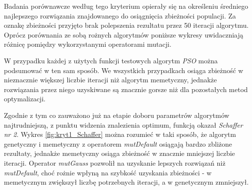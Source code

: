 \par
Badania porównawcze według tego kryterium opierały się na określeniu średniego najlepszego rozwiązania znajdowanego do osiągnięcia zbieżności populacji. Za oznakę zbieżności przyjęto brak polepszenia rezultatu przez 50 iteracji algorytmu. Oprócz porównania ze sobą rożnych algorytmów poniższe wykresy uwidaczniają różnicę pomiędzy wykorzystanymi operatorami mutacji. 
\par
W przypadku każdej z użytych funkcji testowych algorytm \emph{PSO} można podsumować w ten sam sposób. We wszystkich przypadkach osiąga zbieżność w nieznacznie większej liczbie iteracji niż algorytm memetyczny, jednakże rozwiązania przez niego uzyskiwane są znacznie gorsze niż dla pozostałych metod optymalizacji. 
\par 
Zgodnie z tym co zauważono już na etapie doboru parametrów algorytmów  najtrudniejszą, z punktu widzenia znalezienia optimum, funkcją okazał \emph{Schaffer nr 2}. Wykres \ref{fig:kryt1_Schaffer} można rozumieć w taki sposób, że algorytm genetyczny i memetyczny z operatorem \emph{mutDefault} osiągają bardzo zbliżone rezultaty, jednakże memetyczny osiąga zbieżność w znacznie mniejszej liczbie iteracji. Operator \emph{mutGauss} pozwolił na uzyskanie lepszych rozwiązań niż \emph{mutDefault}, choć rożnie wpłyną na szybkość uzyskania zbieżności - w memetycznym zwiększył liczbę potrzebnych iteracji, a w genetycznym zmniejszył. 

